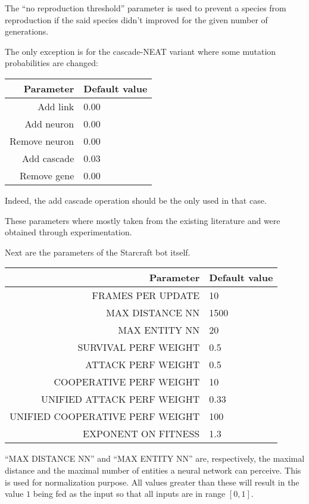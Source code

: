 The ``no reproduction threshold'' parameter is used to prevent a species from reproduction if the
said species didn't improved for the given number of generations.

The only exception is for the cascade-NEAT variant where some mutation probabilities are changed:

\begin{tabular}{rl}
    \toprule
    Parameter & Default value \\
    \midrule
    Add link & 0.00 \\
    Add neuron & 0.00 \\
    Remove neuron & 0.00 \\
    Add cascade & 0.03 \\
    Remove gene & 0.00 \\
    \bottomrule
\end{tabular}

Indeed, the add cascade operation should be the only used in that case.

These parameters where mostly taken from the existing literature and were obtained through experimentation.

Next are the parameters of the Starcraft bot itself.

\begin{tabular}{rl}
    \toprule
    Parameter & Default value \\
    \midrule
    FRAMES PER UPDATE & 10 \\
    MAX DISTANCE NN & 1500 \\
    MAX ENTITY NN  & 20 \\[1ex]

    SURVIVAL PERF WEIGHT & 0.5 \\
    ATTACK PERF WEIGHT & 0.5 \\
    COOPERATIVE PERF WEIGHT & 10 \\
    UNIFIED ATTACK PERF WEIGHT & 0.33 \\
    UNIFIED COOPERATIVE PERF WEIGHT & 100 \\
    EXPONENT ON FITNESS & 1.3 \\
    \bottomrule
\end{tabular}

``MAX DISTANCE NN'' and ``MAX ENTITY NN'' are, respectively, the maximal distance and the maximal number of entities a neural network can perceive.
This is used for normalization purpose. All values greater than these will result in the value \(1\) being fed as the input so that
all inputs are in range \([0, 1]\).

